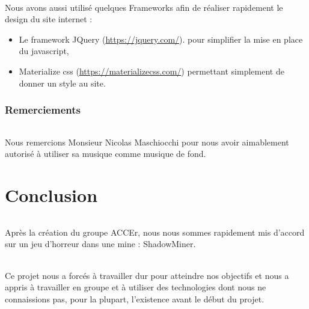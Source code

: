 \documentclass[titlepage, 13px, a4paper]{report}
\begin{document}
\paragraph{} \hspace{0pt}
Nous avons aussi utilisé quelques Frameworks  afin de réaliser rapidement le design du site internet :
{\begin{itemize}
	\item Le framework JQuery (\url{https://jquery.com/}). pour simplifier la mise en place du javascript,
	\item Materialize css (\url{https://materializecss.com/}) permettant simplement de donner un style au site. \\
\end{itemize}}

\section{Remerciements}
\paragraph{} \hspace{0pt}
Nous remercions Monsieur Nicolas Maschiocchi pour nous avoir aimablement autorisé à utiliser sa musique 
comme musique de fond. \\


\newpage


\part{Conclusion}
\paragraph{} \hspace{0pt}
Après la création du groupe ACCEr, nous nous sommes rapidement mis d’accord sur un jeu 
d’horreur dans une mine : ShadowMiner. \\

\paragraph{} \hspace{0pt}
Ce projet nous a forcés à travailler dur pour atteindre nos objectifs et nous a appris à 
travailler en groupe et à utiliser des technologies dont nous ne connaissions pas, pour la 
plupart, l’existence avant le début du projet. \\
\end{document}
